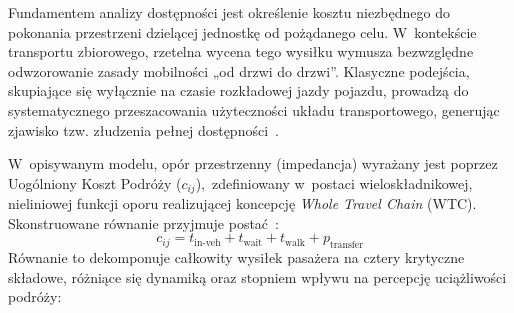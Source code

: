 \documentclass{pracamgr}
\begin{document}
Fundamentem analizy dostępności jest określenie kosztu niezbędnego do pokonania przestrzeni dzielącej jednostkę od pożądanego celu. W~kontekście transportu zbiorowego, rzetelna wycena tego wysiłku wymusza bezwzględne odwzorowanie zasady mobilności „od drzwi do drzwi”. Klasyczne podejścia, skupiające się wyłącznie na czasie rozkładowej jazdy pojazdu, prowadzą do systematycznego przeszacowania użyteczności układu transportowego, generując zjawisko tzw. złudzenia pełnej dostępności~\cite{review, literature_review, capetown}.

W~opisywanym modelu, opór przestrzenny (impedancja) wyrażany jest poprzez Uogólniony Koszt Podróży ($c_{ij}$),~zdefiniowany w~postaci wieloskładnikowej, nieliniowej funkcji oporu realizującej koncepcję \textit{Whole Travel Chain} (WTC). Skonstruowane równanie przyjmuje postać~\cite{LUO2019102505}:
$$c_{ij} = t_{\text{in-veh}} + t_{\text{wait}} + t_{\text{walk}} + p_{\text{transfer}}$$
Równanie to dekomponuje całkowity wysiłek pasażera na cztery krytyczne składowe, różniące się dynamiką oraz stopniem wpływu na percepcję uciążliwości podróży:
\end{document}
